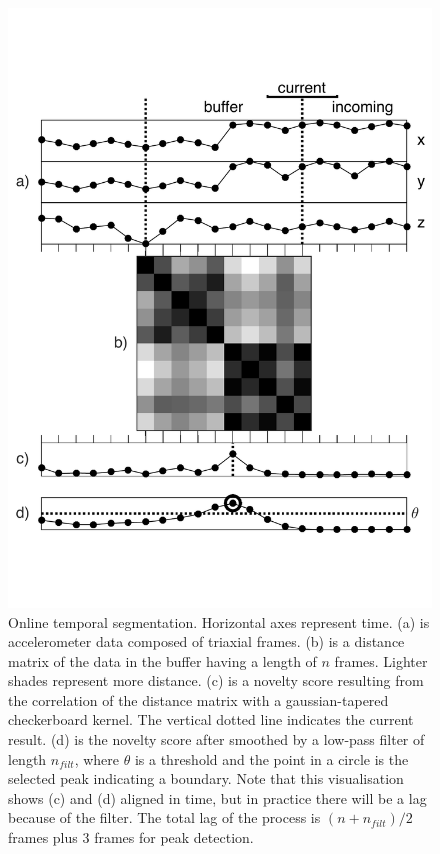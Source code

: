 \documentclass{nime-alternate_ADJ} %
\begin{document}
\begin{figure}[ht!]
	\centering
		\includegraphics[trim={0.3cm 3.5cm 0.3cm 3.5cm}, clip=true, width=1\columnwidth]{fig_1_LO}
	\caption{Online temporal segmentation. Horizontal axes represent time. (a) is accelerometer data composed of triaxial frames. (b) is a distance matrix of the data in the buffer having a length of $n$ frames. Lighter shades represent more distance. (c) is a novelty score resulting from the correlation of the distance matrix with a gaussian-tapered checkerboard kernel. The vertical dotted line indicates the current result. (d) is the novelty score after smoothed by a low-pass filter of length $n_{filt}$, where $\theta$ is a threshold and the point in a circle is the selected peak indicating a  boundary. Note that this visualisation shows (c) and (d) aligned in time, but in practice there will be a lag because of the filter. The total lag of the process is $(n+ n_{filt})/2$ frames plus 3 frames for peak detection.}
	\label{fig_1}
\end{figure}
\end{document}
